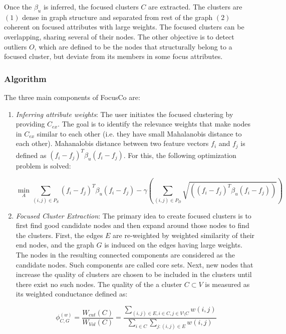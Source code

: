 \documentclass[11pt, oneside]{article}   	%
\begin{document}
\quad Once the $\beta_u$ is inferred, the focused clusters $C$ are extracted. 
The clusters are $(1)$ dense in graph structure and separated from rest of the graph $(2)$ coherent on focused attributes with large weights.
The focused clusters can be overlapping, sharing several of their nodes.
The other objective is to detect outliers $O$, which are defined to be the nodes that structurally belong to a focused cluster, but deviate from its members in some focus attributes.

\subsubsection*{Algorithm}

\quad The three main components of FocusCo are:
\begin{enumerate}
\item \emph{Inferring attribute weights}: 
The user initiates the focused clustering by providing $C_{ex}$.
The goal is to identify the relevance weights that make nodes in $C_{ex}$ similar to each other (i.e. they have small Mahalanobis distance to each other).
Mahanalobis distance between two feature vectors $f_i$ and $f_j$ is defined as $(f_i - f_j)^T\beta_u(f_i-f_j)$. For this, the following optimization problem is solved:

\begin{equation*}
\min_{A} \sum_{(i,j) \in P_S}(f_i - f_j)^T\beta_u(f_i-f_j) - \gamma \left( \sum_{(i,j) \in P_D} \sqrt{((f_i - f_j)^T\beta_u(f_i-f_j))} \right)
\end{equation*}  

\item \emph{Focused Cluster Extraction}: 
The primary idea to create focused clusters is to first find good candidate nodes and then expand around those nodes to find the clusters.
First, the edges $E$ are re-weighted by weighted similarity of their end nodes, and the graph $G$ is induced on the edges having large weights.
The nodes in the resulting connected components are considered as the candidate nodes. Such components are called core sets.
Next, new nodes that increase the quality of clusters are chosen to be included in the clusters until there exist no such nodes.
The quality of the a cluster $C \subset V$ is measured as its weighted conductance defined as:

\begin{equation*}
\phi^{(w)}_{C, G} = \frac{W_{cut}(C)}{W_{Vol}(C)} = \frac {\sum\limits_{(i,j)\in E, i\in C, j\in V\setminus C}w(i,j)} 
														  {\sum\limits_{i\in C} \sum\limits_{j:(i,j)\in E}w(i,j)}
\end{equation*}


\end{enumerate}
\end{document}
